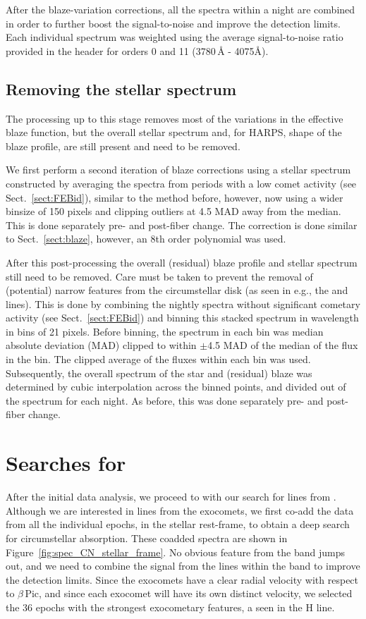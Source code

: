 \documentclass{aa}
\newcommand{\bp}{$\beta$\,Pic}
\begin{document}
After the blaze-variation corrections, all the spectra within a night are combined in order to further boost the signal-to-noise and improve the detection limits.
%
Each individual spectrum was weighted using the average signal-to-noise ratio provided in the header for orders 0 and 11 (3780\,\AA{} - 4075\AA).

\subsection{Removing the stellar spectrum}\label{sect:starcor}
The processing up to this stage removes most of the variations in the effective blaze function, but the overall stellar spectrum and, for HARPS, shape of the blaze profile, are still present and need to be removed. 

We first perform a second iteration of blaze corrections using a stellar spectrum constructed by averaging the spectra from periods with a low comet activity (see Sect.~\ref{sect:FEBid}), similar to the method before, however, now using a wider binsize of 150 pixels and clipping outliers at 4.5 MAD away from the median.
%
This is done separately pre- and post-fiber change. The correction is done similar to Sect.~\ref{sect:blaze}, however, an 8th order polynomial was used.

After this post-processing the overall (residual) blaze profile and stellar spectrum still need to be removed.
%
Care must be taken to prevent the removal of (potential) narrow features from the circumstellar disk (as seen in e.g., the  and  lines).
%
This is done by combining the nightly spectra without significant cometary activity (see Sect.~\ref{sect:FEBid}) and binning this stacked spectrum in wavelength in bins of 21 pixels.
%
Before binning, the spectrum in each bin was median absolute deviation (MAD) clipped to within $\pm$4.5 MAD of the median of the flux in the bin.
%
The clipped average of the fluxes within each bin was used.
%
Subsequently, the overall spectrum of the star and (residual) blaze was determined by cubic interpolation across the binned points, and divided out of the spectrum for each night.
%
As before, this was done separately pre- and post-fiber change.

\section{Searches for \texorpdfstring{}{CN}}\label{sect:CNsearch}

After the initial data analysis, we proceed to with our search for lines from .
%
Although we are interested in lines from the exocomets, we first co-add the data from all the individual epochs, in the stellar rest-frame, to obtain a deep search for circumstellar  absorption.
%
These coadded spectra are shown in Figure~\ref{fig:spec_CN_stellar_frame}.
%
No obvious feature from the  band jumps out, and we need to combine the signal from the lines within the  band to improve the detection limits.
%
Since the exocomets have a clear radial velocity with respect to \bp{}, and since each exocomet will have its own distinct velocity, we selected the 36 epochs with the strongest exocometary features, a seen in the  H line. 
\end{document}
